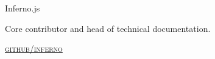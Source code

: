 {\raggedright
  {\large {
    Inferno.js
  } \\}


  Core contributor and head of technical documentation.

  \textsc{\small\href{http://github.com/trueadm/inferno}{github/inferno}}
} \\
